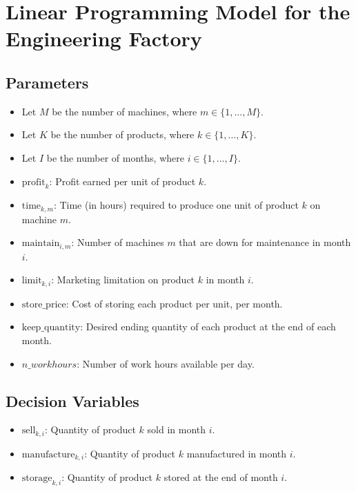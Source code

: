 \documentclass{article}
\begin{document}
\section*{Linear Programming Model for the Engineering Factory}

\subsection*{Parameters}
\begin{itemize}
    \item Let \( M \) be the number of machines, where \( m \in \{1, \ldots, M\} \).
    \item Let \( K \) be the number of products, where \( k \in \{1, \ldots, K\} \).
    \item Let \( I \) be the number of months, where \( i \in \{1, \ldots, I\} \).
    \item \( \text{profit}_k \): Profit earned per unit of product \( k \).
    \item \( \text{time}_{k,m} \): Time (in hours) required to produce one unit of product \( k \) on machine \( m \).
    \item \( \text{maintain}_{i,m} \): Number of machines \( m \) that are down for maintenance in month \( i \).
    \item \( \text{limit}_{k,i} \): Marketing limitation on product \( k \) in month \( i \).
    \item \( \text{store\_price} \): Cost of storing each product per unit, per month.
    \item \( \text{keep\_quantity} \): Desired ending quantity of each product at the end of each month.
    \item \( n\_workhours \): Number of work hours available per day.
\end{itemize}

\subsection*{Decision Variables}
\begin{itemize}
    \item \( \text{sell}_{k,i} \): Quantity of product \( k \) sold in month \( i \).
    \item \( \text{manufacture}_{k,i} \): Quantity of product \( k \) manufactured in month \( i \).
    \item \( \text{storage}_{k,i} \): Quantity of product \( k \) stored at the end of month \( i \).
\end{itemize}
\end{document}
